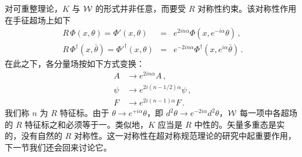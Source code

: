 对可重整理论，$K$ 与 ${\cal W}$ 的形式并非任意，而要受 $R$ 对称性约束。该对称性作用在手征超场上如下
\begin{eqnarray}
R\,\Phi (x,\theta) = \Phi'(x,\theta) &=& e^{2 in\alpha}
\Phi (x, e^{-i\alpha}\theta)\,, \nonumber \\
R\,\Phi^\dagger(x,\bar\theta ) = \Phi'^\dagger(x,\theta) &=& e^{-2
in\alpha}\Phi^\dagger(x, e^{i \alpha}\bar{\theta})\,. \nonumber
\end{eqnarray}
在此之下，各分量场按如下方式变换：
$$
\begin{array}{lll}
A & \rightarrow e^{2i n \alpha} A \,,\\
\psi & \rightarrow e^{2i(n-1/2) \alpha} \psi\,, \\
F & \rightarrow e^{2i(n-1) \alpha} F\,.
\end{array}
$$
我们称 $n$ 为 $R$ 特征标。由于 $\theta \rightarrow
e^{+i\alpha}\theta$，即 $d^2\theta \rightarrow e^{-2 i\alpha}d^2
\theta$，${\cal W}$ 每一项中各超场的 $R$ 特征标之和必须等于一。类似地，$K$ 应当是 $R$ 中性的。矢量多重态是实的，没有自然的 $R$ 对称性。这一对称性在超对称规范理论的研究中起重要作用，下一节我们还会回来讨论它。


